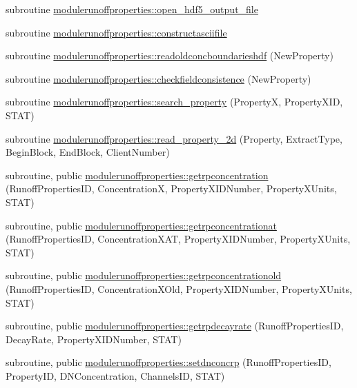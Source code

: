 \begin{DoxyCompactItemize}
\item 
subroutine \mbox{\hyperlink{namespacemodulerunoffproperties_a4ef5ab78c07d6707611f74abfd05eab1}{modulerunoffproperties\+::open\+\_\+hdf5\+\_\+output\+\_\+file}}
\item 
subroutine \mbox{\hyperlink{namespacemodulerunoffproperties_a45fc4e5579efd1a6fc669b8461d2b427}{modulerunoffproperties\+::constructasciifile}}
\item 
subroutine \mbox{\hyperlink{namespacemodulerunoffproperties_a51f42b03c77afc107222186d842f228e}{modulerunoffproperties\+::readoldconcboundarieshdf}} (New\+Property)
\item 
subroutine \mbox{\hyperlink{namespacemodulerunoffproperties_a06845b65870b1cb0e5333b9ef618d43d}{modulerunoffproperties\+::checkfieldconsistence}} (New\+Property)
\item 
subroutine \mbox{\hyperlink{namespacemodulerunoffproperties_a13bbe5dac13800aec15511ca3b8b2a66}{modulerunoffproperties\+::search\+\_\+property}} (PropertyX, Property\+X\+ID, S\+T\+AT)
\item 
subroutine \mbox{\hyperlink{namespacemodulerunoffproperties_afc75586d1d0e2fe3793c44849c61d34a}{modulerunoffproperties\+::read\+\_\+property\+\_\+2d}} (Property, Extract\+Type, Begin\+Block, End\+Block, Client\+Number)
\item 
subroutine, public \mbox{\hyperlink{namespacemodulerunoffproperties_a573e563dd1e9a23460bac6983ddf6ceb}{modulerunoffproperties\+::getrpconcentration}} (Runoff\+Properties\+ID, ConcentrationX, Property\+X\+I\+D\+Number, Property\+X\+Units, S\+T\+AT)
\item 
subroutine, public \mbox{\hyperlink{namespacemodulerunoffproperties_adc6e3ba349efad4b60c9287d22e284e9}{modulerunoffproperties\+::getrpconcentrationat}} (Runoff\+Properties\+ID, Concentration\+X\+AT, Property\+X\+I\+D\+Number, Property\+X\+Units, S\+T\+AT)
\item 
subroutine, public \mbox{\hyperlink{namespacemodulerunoffproperties_a2a7cc1e8991c2e54574415d7f00a5874}{modulerunoffproperties\+::getrpconcentrationold}} (Runoff\+Properties\+ID, Concentration\+X\+Old, Property\+X\+I\+D\+Number, Property\+X\+Units, S\+T\+AT)
\item 
subroutine, public \mbox{\hyperlink{namespacemodulerunoffproperties_a948f11bb3ded4d5dcba4b7d9ddb002f9}{modulerunoffproperties\+::getrpdecayrate}} (Runoff\+Properties\+ID, Decay\+Rate, Property\+X\+I\+D\+Number, S\+T\+AT)
\item 
subroutine, public \mbox{\hyperlink{namespacemodulerunoffproperties_af1a385e164dd67d336a71fada3a6e2b2}{modulerunoffproperties\+::setdnconcrp}} (Runoff\+Properties\+ID, Property\+ID, D\+N\+Concentration, Channels\+ID, S\+T\+AT)

\end{DoxyCompactItemize}
